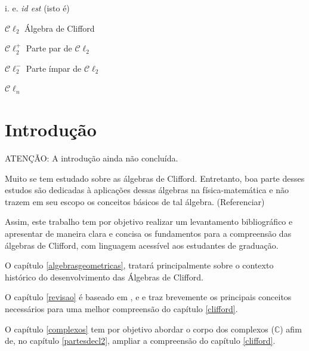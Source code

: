 \documentclass[12pt, oneside, a4paper, english, brazil]{abntex2}
\newcommand{\C}{\mathbb{C}}
\providecommand{\ac}{Álgebras de Clifford}
\providecommand{\Cl}{\mathcal{C}\ell}
\providecommand{\Cldois}{\mathcal{C}\ell_2}
\providecommand{\Cldoispar}{\mathcal{C}\ell_2^{+}}
\providecommand{\Cldoisimpar}{\mathcal{C}\ell_2^{-}}
\theoremstyle{normal}
\theoremstyle{observacao}
\begin{document}
\begin{siglas}
\item[i. e.] \textit{id est} (isto é)
\end{siglas}

\begin{simbolos}
\item[$\Cldois$] Álgebra de Clifford
\item[$\Cldoispar$] Parte par de $\Cldois$
\item[$\Cldoisimpar$] Parte ímpar de $\Cldois$
\item[$\Cl_n$] 
\end{simbolos}

\tableofcontents*
\cleardoublepage


\textual
\pagestyle{simple}

\chapter{Introdução}

ATENÇÃO: A introdução ainda não concluída.

Muito se tem estudado sobre as álgebras de Clifford. Entretanto, boa parte desses estudos são dedicadas à aplicações dessas álgebras na física-matemática e não trazem em seu escopo os conceitos básicos de tal álgebra. (Referenciar)

Assim, este trabalho tem por objetivo realizar um levantamento bibliográfico e apresentar de maneira clara e concisa os fundamentos para a compreensão das álgebras de Clifford, com linguagem acessível aos estudantes de graduação.


O capítulo \ref{algebrasgeometricas}, tratará principalmente sobre o contexto histórico do desenvolvimento das \ac. 

O capítulo \ref{revisao} é baseado em ,  e  e traz brevemente os principais conceitos necessários para uma melhor compreensão do capítulo \ref{clifford}. 

O capítulo \ref{complexos} tem por objetivo abordar o corpo dos complexos ($\C$) afim de, no capítulo \ref{partesdecl2}, ampliar a compreensão do capítulo \ref{clifford}.
\end{document}
